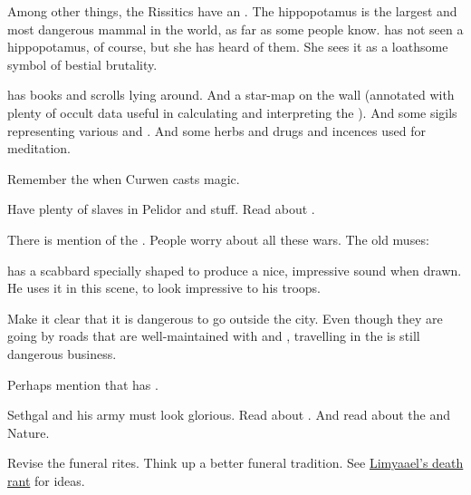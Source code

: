 \begin{changes}
    Among other things, the Rissitics have an . 
    The hippopotamus is the largest and most dangerous mammal in the world, as far as some people know.
    \Tiroco has not seen a hippopotamus, of course, but she has heard of them.
    She sees it as a loathsome symbol of bestial brutality. 

    \Onatol{} has books and scrolls lying around. 
    And a star-map on the wall (annotated with plenty of occult data useful in calculating and interpreting the \matrices). 
    And some sigils representing various \sephiroth{} and \qliphoth. 
    And some herbs and drugs and incences used for meditation. 
    
    Remember the  when Curwen casts magic. 
    
    Have plenty of  slaves in Pelidor and stuff. 
    Read about .
    
  \begin{comment}
  \paragraph{War is Coming}
  \end{comment}
    There is mention of the . 
    People worry about all these wars. 
    The old \sphyle{} muses: 

     has a scabbard specially shaped to produce a nice, impressive  sound when drawn.
    He uses it in this scene, to look impressive to his troops. 
    
    Make it clear that it is dangerous to go outside the city. 
    Even though they are going by roads that are well-maintained with  and , travelling in the \wylde is still dangerous business. 
    
    Perhaps mention that \Sethgal has .
    
    Sethgal and his army must look glorious.
    Read about .
    And read about the \wylde and Nature. 
  
  \begin{comment}\paragraph{Beyond the Veil}\end{comment}
    Revise the funeral rites. 
    Think up a better funeral tradition. 
    See \href{http://limyaael.livejournal.com/179073.html}{Limyaael's death rant} for ideas. 
    

\end{changes}
